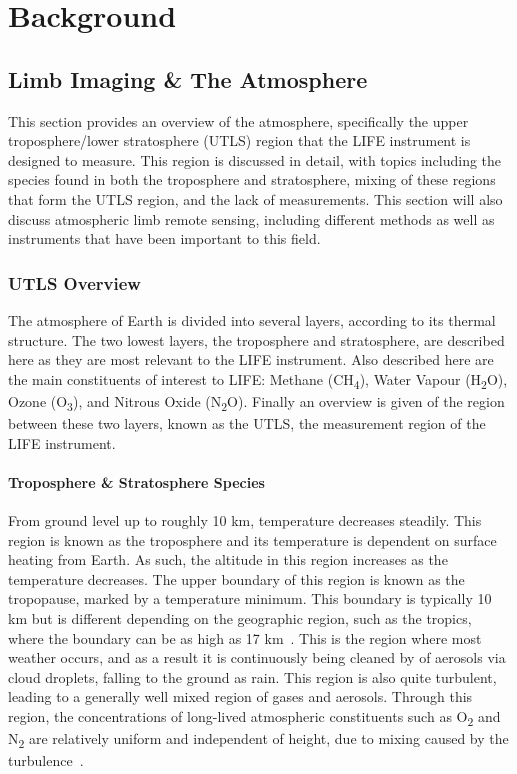 \chapter{Background} \label{bkgnd}

\section{Limb Imaging \& The Atmosphere}
This section provides an overview of the atmosphere, specifically the upper troposphere/lower stratosphere (UTLS) region that the LIFE instrument is designed to measure. This region is discussed in detail, with topics including the species found in both the troposphere and stratosphere, mixing of these regions that form the UTLS region, and the lack of measurements. This section will also discuss atmospheric limb remote sensing, including different methods as well as instruments that have been important to this field.

\subsection{UTLS Overview}
The atmosphere of Earth is divided into several layers, according to its thermal structure. The two lowest layers, the troposphere and stratosphere, are described here as they are most relevant to the LIFE instrument. Also described here are the main constituents of interest to LIFE: Methane (CH\textsubscript{4}), Water Vapour (H\textsubscript{2}O), Ozone (O\textsubscript{3}), and Nitrous Oxide (N\textsubscript{2}O). Finally an overview is given of the region between these two layers, known as the UTLS, the measurement region of the LIFE instrument.

\subsubsection{Troposphere \& Stratosphere Species}
From ground level up to roughly 10 km, temperature decreases steadily. This region is known as the troposphere and its temperature is dependent on surface heating from Earth. As such, the altitude in this region increases as the temperature decreases. The upper boundary of this region is known as the tropopause, marked by a temperature minimum. This boundary is typically 10 km but is different depending on the geographic region, such as the tropics, where the boundary can be as high as 17 km~\citep{ext_utls}. This is the region where most weather occurs, and as a result it is continuously being cleaned by of aerosols via cloud droplets, falling to the ground as rain. This region is also quite turbulent, leading to a generally well mixed region of gases and aerosols. Through this region, the concentrations of long-lived atmospheric constituents such as O\textsubscript{2} and N\textsubscript{2} are relatively uniform and independent of height, due to mixing caused by the turbulence~\citep{atmos_phys_and_climate}.


